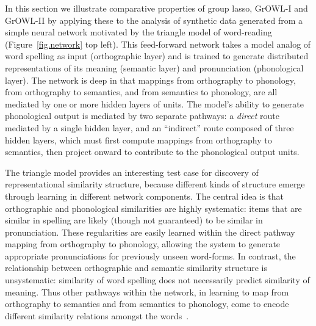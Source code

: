 In this section we illustrate comparative properties of group lasso, GrOWL-I and GrOWL-II
by applying these to the analysis of synthetic data generated from a simple neural network
motivated by the triangle model of word-reading (Figure~\ref{fig.network} top left). This
feed-forward network takes a model analog of word spelling as input (orthographic layer)
and is trained to generate distributed representations of its meaning (semantic layer) and
pronunciation (phonological layer). The network is deep in that mappings from orthography
to phonology, from orthography to semantics, and from semantics to phonology, are all
mediated by one or more hidden layers of units. The model's ability to generate
phonological output is mediated by two separate pathways: a {\em direct} route mediated by
a single hidden layer, and an ``indirect'' route composed of three hidden layers, which
must first compute mappings from orthography to semantics, then project onward to
contribute to the phonological output units.


The triangle model provides an interesting test case for discovery of representational
similarity structure, because different kinds of structure emerge through learning in
different network components. The central idea is that orthographic and phonological
similarities are highly systematic: items that are similar in spelling are likely (though
not guaranteed) to be similar in pronunciation. These regularities are easily learned
within the direct pathway mapping from orthography to phonology, allowing the system to
generate appropriate pronunciations for previously unseen word-forms. In contrast, the
relationship between orthographic and semantic similarity structure is unsystematic:
similarity of word spelling does not necessarily predict similarity of meaning. Thus other
pathways within the network, in learning to map from orthography to semantics and from
semantics to phonology, come to encode different similarity relations amongst the
words~\cite{PlautETAL96,HarmSeidenberg04}.

